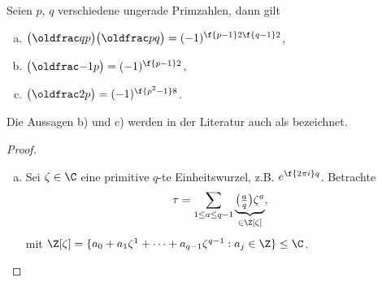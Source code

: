 \begin{st} \label{2.15}
	Seien $p$, $q$ verschiedene ungerade Primzahlen, dann gilt
	\begin{enumerate}[a)]
		\item
			$\legsym qp \legsym pq = (-1)^{\f {p-1}2 \f{q-1}2}$,
		\item
			$\legsym {-1}p = (-1)^{\f {p-1}2}$,
		\item
			$\legsym 2p = (-1)^{\f{p^2 -1}8}$.
	\end{enumerate}
	Die Aussagen b) und c) werden in der Literatur auch als  bezeichnet.
	\begin{proof}
		\begin{enumerate}[a)]
			\item
				Sei $\zeta \in \C$ eine primitive $q$-te Einheitswurzel, z.B. $e^{\f{2\pi i}q}$.
				Betrachte
				\[
					\tau = \sum_{1 \le a \le q-1} \underbrace{\legsym aq \zeta^a}_{\in \Z[\zeta]},
				\]
				mit $\Z[\zeta] = \{ a_0 + a_1 \zeta^1 + \dotsb + a_{q-1} \zeta^{q-1} : a_j \in \Z\} \le \C$.


\end{enumerate}
\end{proof}
\end{st}
